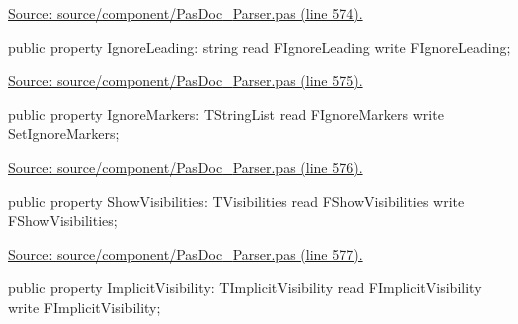 \documentclass{report}
\newif\ifpdf
\begin{document}
\begin{list}{}
\begin{flushleft}
\ifpdf
\end{flushleft}
\fi


\par  \par
\href{https://github.com/pasdoc/pasdoc/blob/master/source/component/PasDoc_Parser.pas#L574}{Source: source/component/PasDoc{\_}Parser.pas (line 574).}\label{PasDoc_Parser.TParser-IgnoreLeading}
\item[\textbf{IgnoreLeading}\hfill]
\ifpdf
\begin{flushleft}
\fi
\begin{ttfamily}
public property IgnoreLeading: string read FIgnoreLeading write FIgnoreLeading;\end{ttfamily}

\ifpdf
\end{flushleft}
\fi


\par  \par
\href{https://github.com/pasdoc/pasdoc/blob/master/source/component/PasDoc_Parser.pas#L575}{Source: source/component/PasDoc{\_}Parser.pas (line 575).}\label{PasDoc_Parser.TParser-IgnoreMarkers}
\item[\textbf{IgnoreMarkers}\hfill]
\ifpdf
\begin{flushleft}
\fi
\begin{ttfamily}
public property IgnoreMarkers: TStringList read FIgnoreMarkers write SetIgnoreMarkers;\end{ttfamily}

\ifpdf
\end{flushleft}
\fi


\par  \par
\href{https://github.com/pasdoc/pasdoc/blob/master/source/component/PasDoc_Parser.pas#L576}{Source: source/component/PasDoc{\_}Parser.pas (line 576).}\label{PasDoc_Parser.TParser-ShowVisibilities}
\item[\textbf{ShowVisibilities}\hfill]
\ifpdf
\begin{flushleft}
\fi
\begin{ttfamily}
public property ShowVisibilities: TVisibilities
      read FShowVisibilities write FShowVisibilities;\end{ttfamily}

\ifpdf
\end{flushleft}
\fi


\par  \par
\href{https://github.com/pasdoc/pasdoc/blob/master/source/component/PasDoc_Parser.pas#L577}{Source: source/component/PasDoc{\_}Parser.pas (line 577).}\label{PasDoc_Parser.TParser-ImplicitVisibility}
\item[\textbf{ImplicitVisibility}\hfill]
\ifpdf
\begin{flushleft}
\fi
\begin{ttfamily}
public property ImplicitVisibility: TImplicitVisibility
      read FImplicitVisibility write FImplicitVisibility;\end{ttfamily}


\end{flushleft}
\end{list}
\end{document}
